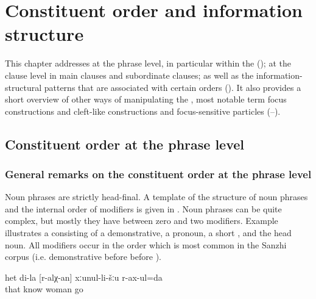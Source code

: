 \chapter{Constituent order and information structure}
\label{cpt:Constituent order and information structure}

This chapter addresses  at the phrase level, in particular within the  ();  at the clause level in main clauses and subordinate clauses; as well as the information-structural patterns that are associated with certain orders (). It also provides a short overview of other ways of manipulating the , most notable term focus constructions and cleft-like constructions and focus-sensitive particles (--).



\section{Constituent order at the phrase level}
\label{sec:Constituent order at the phrase level}

\subsection{General remarks on the constituent order at the phrase level}
\label{ssec:General remarks on the constituent order at the phrase level}

Noun phrases are strictly head-final. A template of the structure of noun phrases and the internal order of modifiers is given in . Noun phrases can be quite complex, but mostly they have between zero and two modifiers. Example  illustrates a  consisting of a demonstrative, a  pronoun, a short , and the head noun. All modifiers occur in the order which is most common in the Sanzhi corpus (i.e. demonstrative before  before ).
%
\begin{exe}
	\ex	\label{ex:‎‎‎I go to my woman who I know}
	\gll	het	di-la	[r-alχ-an]	xːunul-li-šːu	r-ax-ul=da\\
		that		know	woman	go\\
	\glt	{}
\end{exe}

